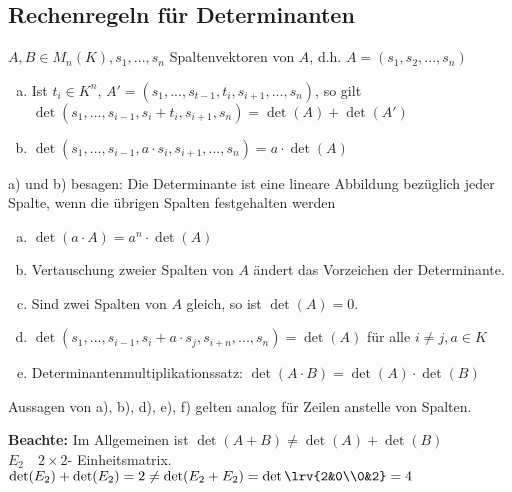 \subsection{Rechenregeln für Determinanten}
  $A,B\in M_n(K),s_1,...,s_n$ Spaltenvektoren von $A$, d.h. $A=(s_1,s_2,...,s_n)$
  \begin{enumerate}[a)]
    \item Ist $t_i\in K^n$, $A'=(s_1,...,s_{t-1},t_i,s_{i+1},...,s_n)$, so gilt
      $\det(s_1,...,s_{i-1},s_i+t_i,s_{i+1},s_n)=\det(A)+\det(A')$
    \item $\det(s_1,...,s_{i-1},a\cdot s_i,s_{i+1},...,s_n)=a\cdot\det(A)$
  \end{enumerate}
  a) und b) besagen: Die Determinante ist eine lineare Abbildung bezüglich
  jeder Spalte, wenn die übrigen Spalten festgehalten werden
  \begin{enumerate}[c)]
    \item $\det(a\cdot A)=a^n\cdot\det(A)$
    \item Vertauschung zweier Spalten von $A$ ändert das Vorzeichen der
      Determinante.
    \item Sind zwei Spalten von $A$ gleich, so ist $\det(A)=0$.
    \item $\det(s_1,...,s_{i-1},s_i+a\cdot s_j,s_{i+n},...,s_n)=\det(A)$ für
      alle $i\neq j,a\in K$
    \item Determinantenmultiplikationssatz: $\det(A\cdot
      B)=\det(A)\cdot\det(B)$
  \end{enumerate}

  Aussagen von a), b), d), e), f) gelten analog für Zeilen anstelle von
  Spalten.

  \textbf{Beachte:} Im Allgemeinen ist $\det(A+B)\neq\det(A)+\det(B)$\\

  $E_2\quad 2\times 2$- Einheitsmatrix.\\
  $\det(E_2)+\det(E_2)=2\neq\det(E_2+E_2)=\det\lrv{2&0\\0&2}=4$


